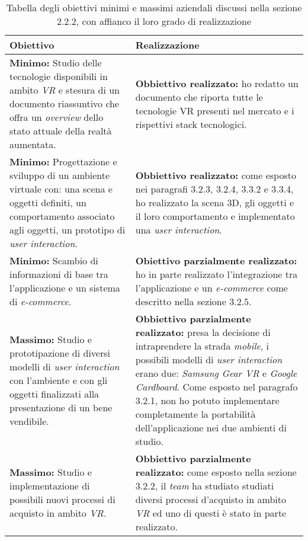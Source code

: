 \begin{table}
	\centering
	\label{tabella-obiettivi}
	\begin{tabular}{| p{6cm} | p{6cm} |}
		\hline
		\textbf{Obiettivo} & \textbf{Realizzazione} \\ \hline
		 \textbf{Minimo:} Studio delle tecnologie disponibili in ambito \textit{VR}\ped{\hyperlink{vr}{G}} e stesura di un documento riassuntivo che offra un \textit{overview} dello stato attuale della realtà aumentata. &  \textbf{Obbiettivo realizzato:} ho redatto un documento che riporta tutte le tecnologie VR presenti nel mercato e i rispettivi stack tecnologici.\\ \hline
		 \textbf{Minimo:} Progettazione e sviluppo di un ambiente virtuale con: una scena e oggetti definiti, un comportamento associato agli oggetti, un prototipo di \textit{user interaction}. & \textbf{Obbiettivo realizzato:} come esposto nei paragrafi 3.2.3, 3.2.4, 3.3.2 e 3.3.4, ho realizzato la scena 3D, gli oggetti e il loro comportamento e implementato una \textit{user interaction}. \\ \hline
		 \textbf{Minimo:} Scambio di informazioni di base tra l'applicazione e un sistema di \textit{e-commerce}. & \textbf{Obiettivo parzialmente realizzato:} ho in parte realizzato l'integrazione tra l'applicazione e un \textit{e-commerce} come descritto nella sezione 3.2.5.\\ \hline
		 \textbf{Massimo:} Studio e prototipazione di diversi modelli di \textit{user interaction} con l'ambiente e con gli oggetti finalizzati alla presentazione di un bene vendibile. & \textbf{Obbiettivo parzialmente realizzato:} presa la decisione di intraprendere la strada \textit{mobile}, i possibili modelli di \textit{user interaction} erano due: \textit{Samsung Gear VR} e \textit{Google Cardboard}. Come esposto nel paragrafo 3.2.1, non ho potuto implementare completamente la portabilità dell'applicazione nei due ambienti di studio.\\ \hline
		 \textbf{Massimo:} Studio e implementazione di possibili nuovi processi di acquisto in ambito \textit{VR}\ped{\hyperlink{vr}{G}}. & \textbf{Obbiettivo parzialmente realizzato:} come esposto nella sezione 3.2.2, il \textit{team} ha studiato studiati diversi processi d'acquisto in ambito \textit{VR}\ped{\hyperlink{vr}{G}} ed uno di questi è stato in parte realizzato.\\ \hline
	\end{tabular}
	\caption{Tabella degli obiettivi minimi e massimi aziendali discussi nella sezione 2.2.2, con affianco il loro grado di realizzazione}
\end{table}
\FloatBarrier

